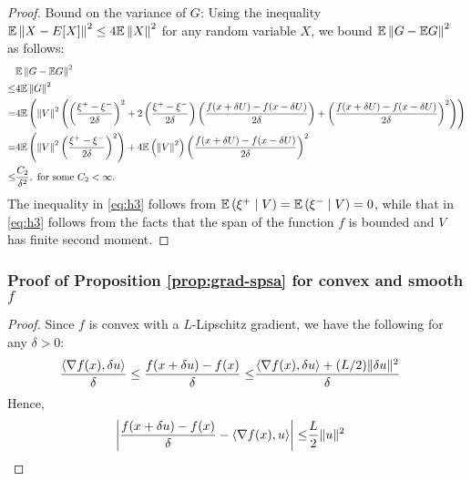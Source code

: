 \begin{proof}
Bound on the variance of $G$:
Using the inequality $\mathbb{E}\left\|X -  E[X]\right\|^2 \le 4 \mathbb{E} \left\|X\right\|^2$ for any random variable $X$, we bound $\mathbb{E}\left\| G - \mathbb{E} G\right\|^2$ as follows:
\begin{align}
&\mathbb{E}\left\| G - \mathbb{E} G\right\|^2 \\
\le& 4 \mathbb{E} \left\|G\right\|^2 \label{eq:mi}\\
= & 4\mathbb{E}\left( \left\| V \right\|^2 \left(\left(\dfrac{\xi^+ - \xi^-}{2\delta}\right)^2  + 2 \left(\dfrac{\xi^+ - \xi^-}{2\delta}\right) \left(\dfrac{f(x+\delta U) - f(x-\delta U)}{2\delta}\right) 
+ \left( \dfrac{f(x+\delta U) - f(x-\delta U)}{2\delta} \right)^2 \right)\right) \\
= & 4\mathbb{E}\left( \left\| V \right\|^2 \left(\dfrac{\xi^+ - \xi^-}{2\delta}\right)^2\right)   
+ 4 \mathbb{E} \left(\left\| V \right\|^2 \right)\left( \dfrac{f(x+\delta U) - f(x-\delta U)}{2\delta} \right)^2  \label{eq:h3} \\
\le & \frac{C_2}{\delta^2}, \text{ for some } C_2< \infty. \label{eq:h4}
\end{align}
The inequality in \eqref{eq:h3} follows from $\mathbb{E}\left( \xi^+ \mid V \right) = \mathbb{E}\left( \xi^- \mid V \right) = 0$, while that in \eqref{eq:h3} follows from the facts that  the span of the function $f$ is bounded and $V$ has finite second moment. 
\end{proof}


\subsubsection*{Proof of Proposition \ref{prop:grad-spsa} for convex and smooth $f$}
\begin{proof}
Since $f$ is convex with a  $L$-Lipschitz gradient, we have the following for any $\delta>0$:
\begin{align*}
\frac{\left\langle\nabla f(x), \delta u\right\rangle}{\delta} \le \frac{f(x + \delta u) -  f(x)}{\delta} \le& \frac{\left\langle\nabla f(x), \delta u\right\rangle + (L / 2) \|\delta u\|^2}{\delta}
\end{align*}
Hence,
\begin{align*}
\left|\frac{f(x + \delta u) -  f(x)}{\delta} - \left\langle\nabla f(x),  u\right\rangle \right| \le&  \dfrac{L}{2} \|u\|^2
\end{align*}

\end{proof}


